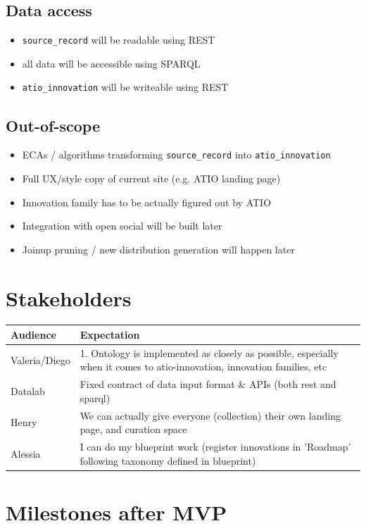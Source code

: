 \documentclass{scrartcl}
\begin{document}
\subsection{Data access}
\label{sec:org32745c8}
\begin{itemize}
\item \texttt{source\_record} will be readable using REST
\item all data will be accessible using SPARQL
\item \texttt{atio\_innovation} will be writeable using REST
\end{itemize}
\subsection{Out-of-scope}
\label{sec:org765dc2f}
\begin{itemize}
\item ECAs / algorithms transforming \texttt{source\_record} into \texttt{atio\_innovation}
\item Full UX/style copy of current site (e.g. ATIO landing page)
\item Innovation family has to be actually figured out by ATIO
\item Integration with open social will be built later
\item Joinup pruning / new distribution generation will happen later
\end{itemize}
\section{Stakeholders}
\label{sec:org0ce7967}

\begin{center}
\begin{tabular}{ll}
Audience & Expectation\\
\hline
Valeria/Diego & 1. Ontology is implemented as closely as possible, especially when it comes to atio-innovation, innovation families, etc\\
Datalab & Fixed contract of data input format \& APIs (both rest and sparql)\\
Henry & We can actually give everyone (collection) their own landing page, and curation space\\
Alessia & I can do my blueprint work (register innovations in 'Roadmap' following taxonomy defined in blueprint)\\
\end{tabular}
\end{center}
\section{Milestones after MVP}
\label{sec:orge3af0f0}
\end{document}
